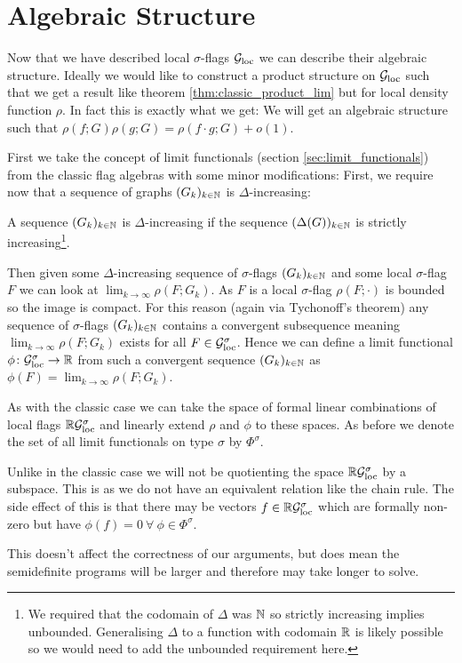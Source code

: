 \section{Algebraic Structure}

Now that we have described local $\sigma$-flags $\mathcal{G}_\text{loc}$ we can describe their
algebraic structure. Ideally we would like to construct a product structure
on $\mathcal{G}_\text{loc}$ such that we get a result like theorem \ref{thm:classic_product_lim} but for
local density function $\rho$. In fact this is exactly what we get: We will get an
algebraic structure such that $\rho(f; G)\rho(g;G) = \rho(f\cdot g; G) + o(1)$.

First we take the concept of limit functionals (section \ref{sec:limit_functionals})
from the classic flag algebras with some minor modifications:
First, we require now that a sequence of graphs $(G_k)_{k\in\mathbb{N}}$ is $\Delta$-increasing:
\begin{definition}
    A sequence $(G_k)_{k\in\mathbb{N}}$ is $\Delta$-increasing if the sequence
    $(\Delta(G))_{k\in\mathbb{N}}$ is strictly increasing\footnote{We required that the codomain of
    $\Delta$ was $\mathbb{N}$ so strictly increasing implies unbounded. Generalising $\Delta$
    to a function with codomain $\mathbb{R}$ is likely possible so we would need to add the
    unbounded requirement here.}.
\end{definition}
Then given some $\Delta$-increasing sequence of $\sigma$-flags $(G_k)_{k\in\mathbb{N}}$
and some local $\sigma$-flag
$F$ we can look at $\lim_{k\to\infty}\rho(F; G_k)$. As $F$ is a local $\sigma$-flag
$\rho(F; \cdot)$ is bounded so the image is compact. For this reason (again via Tychonoff's theorem)
any sequence of $\sigma$-flags $(G_k)_{k\in\mathbb{N}}$ contains a convergent subsequence meaning
$\lim_{k\to\infty}\rho(F; G_k)$ exists for all $F\in\mathcal{G}_\text{loc}^\sigma$.
Hence we can define a limit functional $\phi\colon\mathcal{G}_\text{loc}^\sigma\to\mathbb{R}$
from such a convergent sequence $(G_k)_{k\in\mathbb{N}}$ as $\phi(F)=\lim_{k\to\infty}\rho(F; G_k)$.

As with the classic case we can take the space of formal linear combinations of
local flags $\mathbb{R}\mathcal{G}_\text{loc}^\sigma$ and linearly extend $\rho$ and $\phi$ to these
spaces. As before we denote the set of all limit functionals on type $\sigma$ by
$\Phi^\sigma$.

\begin{note}
    Unlike in the classic case we will not be quotienting the space $\mathbb{R}\mathcal{G}_\text{loc}^\sigma$ by
    a subspace. This is as we do not have an equivalent relation like the chain rule.
    The side effect of this is that there may be vectors $f \in \mathbb{R}\mathcal{G}_\text{loc}^\sigma$ which
    are formally non-zero but have $\phi(f) = 0\ \forall\ \phi\in\Phi^\sigma$.

    This doesn't affect the correctness of our arguments, but does mean the semidefinite
    programs will be larger and therefore may take longer to solve.
\end{note}

